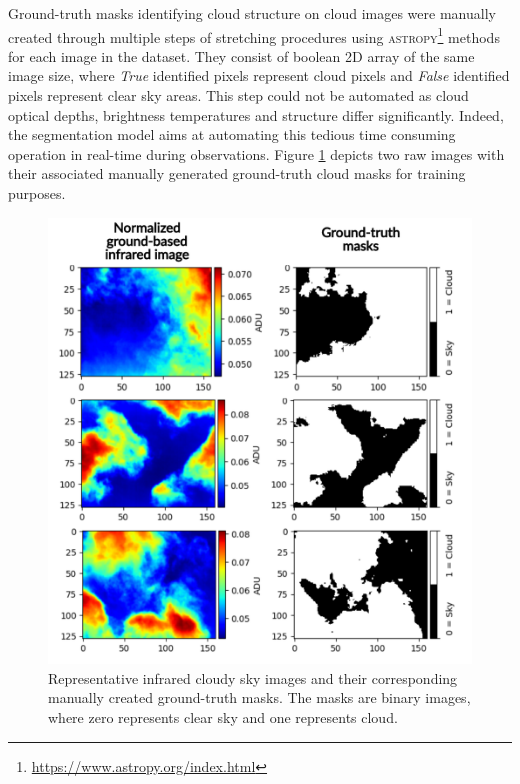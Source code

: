 \documentclass[amt, article]{copernicus}
\begin{document}
Ground-truth masks identifying cloud structure on cloud images were manually created through multiple steps of stretching procedures using \textsc{astropy}\footnote{\url{https://www.astropy.org/index.html}} methods for each image in the dataset. They consist of boolean 2D array of the same image size, where \textit{True} identified pixels represent cloud pixels and \textit{False} identified pixels represent clear sky areas. This step could not be automated as cloud optical depths, brightness temperatures and structure differ significantly. Indeed, the segmentation model aims at automating this tedious time consuming operation in real-time during observations. Figure \ref{fig:cloud_images_ground_truth} depicts two raw images with their associated manually generated ground-truth cloud masks for training purposes.

\begin{figure}[t]
	\includegraphics[width=\hsize]{figures/cloud_images_ground_truth.pdf}
	\caption{Representative infrared cloudy sky images and their corresponding manually created ground-truth masks. The masks are binary images, where zero represents clear sky and one represents cloud.}
    \label{fig:cloud_images_ground_truth}
\end{figure}
\end{document}
